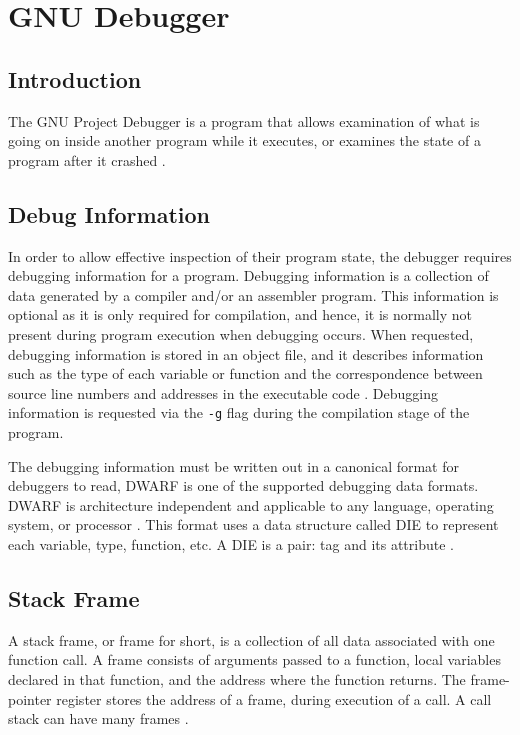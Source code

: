 \chapter{GNU Debugger} \label{GDB}
\section{Introduction}
The GNU Project Debugger is a program that allows examination of what is going on
inside another program while it executes, or examines the state of a program
after it crashed \cite{reference3}.

\section{Debug Information}
In order to allow effective inspection of their program state, the
debugger requires debugging information for a program. Debugging
information is a collection of data generated by a compiler and/or an assembler
program. This information is optional as it is only required for compilation,
and hence, it is normally not present during program execution when debugging
occurs. When requested, debugging information is stored in an object file, and it describes
information such as the type of each variable or function and
the correspondence between source line numbers and addresses in the executable
code \cite{reference6}. Debugging information is requested via the \verb|-g|
flag during the compilation stage of the
program.

The debugging information must be written out in a canonical format for
debuggers to read, DWARF is one of the supported debugging data formats. DWARF is architecture
independent and applicable to any language, operating system, or processor \cite{reference7}. This format uses a data structure called DIE to represent
each variable, type, function, etc. A DIE is a pair: tag
and its attribute \cite{reference8}.

\section{Stack Frame}
A stack frame, or frame for short, is a collection of all data associated with
one function call. A frame consists of arguments passed to a function, local variables declared in that
function, and the address where the
function returns. The frame-pointer register stores the address of a frame,
during execution of a call. A call stack can have many frames \cite{reference12}.

